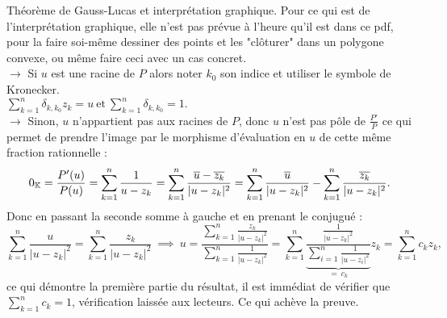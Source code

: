 \documentclass{article}
\renewenvironment{question_kholle}[2][ ]
{
	\subsection{\texorpdfstring{#2}{}}
	\notblank{#1}
	{
		\noindent #1
		\bigbreak
	}
	{}
	\begin{proof}
}
{
	\end{proof}
}
\begin{document}
\begin{question_kholle}
  [Les racines du polynôme dérivée sont dans l'enveloppe convexe des racines du polynôme. \\
    Soit {$P\in \C[X]$} de degré au moins $2$ et notons $z_1, \dots, z_n$ ses racines répétées avec multiplicité. \\
    Soit $u$ une racine de $P'$.
    Alors :
    \begin{equation}
      \exists \ (c_1, \dots, c_n)\in \R ^*_+ \ : \ \sum_{k=1}^n c_k z_k = u \ \text{et} \ \sum_{k=1}^n c_k = 1.
    \end{equation}]
  {Théorème de Gauss-Lucas et interprétation graphique.}
  Pour ce qui est de l'interprétation graphique, elle n'est pas prévue à l'heure qu'il est dans ce pdf, pour la faire soi-même dessiner des points et les "clôturer" dans un polygone convexe, ou même faire ceci avec un cas concret. \\

  \noindent $\rightarrow$ Si $u$ est une racine de $P$ alors noter $k_0$ son indice et utiliser le symbole de Kronecker. \\
  $ \sum_{k=1}^n \delta_{k, k_0} z_k = u \ \text{et} \ \sum_{k=1}^n \delta_{k, k_0} = 1. $ \\
  $\rightarrow$ Sinon, $u$ n'appartient pas aux racines de $P$, donc $u$ n'est pas pôle de $\frac{P'}{P}$ ce qui permet de prendre l'image par le morphisme d'évaluation en $u$ de cette même fraction rationnelle :
  \[
    0_{\mathbb K} = \frac{P'(u)}{P(u)} = \sum_{k = 1}^n \frac{1}{u - z_k} = \sum_{k = 1}^n \frac{\overline{u}- \overline{z_k}}{|u-z_k|^2} = \sum_{k = 1}^n \frac{\overline{u}}{|u-z_k|^2}- \sum_{k = 1}^n \frac{\overline{z_k}}{|u-z_k|^2}.
  \]
  Donc en passant la seconde somme à gauche et en prenant le conjugué :
  \[
    \sum_{k = 1}^n\frac{u}{|u-z_k|^2} = \sum_{k = 1}^n \frac{z_k}{|u-z_k|^2} \ \implies \ u = \frac{\sum_{k = 1}^n \frac{z_k}{|u-z_k|^2}}{\sum_{k = 1}^n\frac{1}{|u-z_k|^2}}= \sum_{k = 1}^n\underset{= \ c_k}{\underbrace{\frac{\frac{1}{|u-z_k|^2}}{\sum_{i = 1}^n\frac{1}{|u-z_i|^2}}}} z_k = \sum_{k=1}^n c_k z_k ,
  \]
  ce qui démontre la première partie du résultat, il est immédiat de vérifier que $\sum_{k=1}^nc_k = 1$, vérification laissée aux lecteurs. Ce qui achève la preuve. \\

  \begin{figure}[H]
    \centering
\end{figure}
\end{question_kholle}
\end{document}
